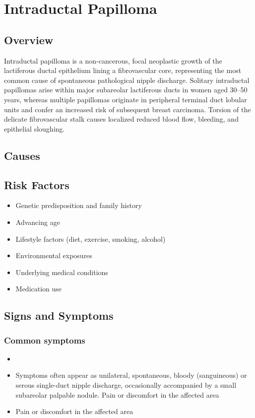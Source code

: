 \chapter{Intraductal Papilloma}
\label{sec:Intraductal Papilloma}

\section{Overview}
Intraductal papilloma is a non-cancerous, focal neoplastic growth of the lactiferous ductal epithelium lining a fibrovascular core, representing the most common cause of spontaneous pathological nipple discharge. Solitary intraductal papillomas arise within major subareolar lactiferous ducts in women aged 30--50 years, whereas multiple papillomas originate in peripheral terminal duct lobular units and confer an increased risk of subsequent breast carcinoma. Torsion of the delicate fibrovascular stalk causes localized reduced blood flow, bleeding, and epithelial sloughing.
\section{Causes}
\section{Risk Factors}

\begin{itemize}[noitemsep]
  \item Genetic predisposition and family history
  \item Advancing age
  \item Lifestyle factors (diet, exercise, smoking, alcohol)
  \item Environmental exposures
  \item Underlying medical conditions
  \item Medication use
\end{itemize}
\section{Signs and Symptoms}

\subsection{Common symptoms}
\begin{itemize}[noitemsep]
  \item \item Symptoms often appear as unilateral, spontaneous, bloody (sanguineous) or serous single-duct nipple discharge, occasionally accompanied by a small subareolar palpable nodule. Pain or discomfort in the affected area    \item Pain or discomfort in the affected area
  \end{itemize}

